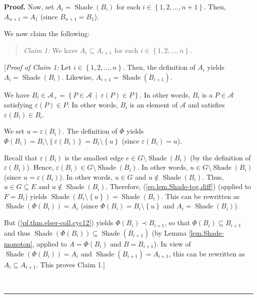 \documentclass[numbers=enddot,12pt,final,onecolumn]{scrartcl}%
\theoremstyle{definition}
\newenvironment{statement}{\begin{quote}}{\end{quote}}
\newenvironment{proof}[1][Proof]{\noindent\textbf{#1.} }{\ \rule{0.5em}{0.5em}}
\begin{document}
\begin{proof}
Now, set $A_{i}=\operatorname*{Shade}\left(  B_{i}\right)  $ for each
$i\in\left\{  1,2,\ldots,n+1\right\}  $. Then, $A_{n+1}=A_{1}$ (since
$B_{n+1}=B_{1}$).

We now claim the following:

\begin{statement}
\textit{Claim 1:} We have $A_{i}\subseteq A_{i+1}$ for each $i\in\left\{
1,2,\ldots,n\right\}  $.
\end{statement}

[\textit{Proof of Claim 1:} Let $i\in\left\{  1,2,\ldots,n\right\}  $. Then,
the definition of $A_{i}$ yields $A_{i}=\operatorname*{Shade}\left(
B_{i}\right)  $. Likewise, $A_{i+1}=\operatorname*{Shade}\left(
B_{i+1}\right)  $.

We have $B_{i}\in\mathcal{A}_{+}=\left\{  P\in\mathcal{A}\ \mid\ \varepsilon
\left(  P\right)  \in P\right\}  $. In other words, $B_{i}$ is a
$P\in\mathcal{A}$ satisfying $\varepsilon\left(  P\right)  \in P$. In other
words, $B_{i}$ is an element of $\mathcal{A}$ and satisfies $\varepsilon
\left(  B_{i}\right)  \in B_{i}$.

We set $u=\varepsilon\left(  B_{i}\right)  $. The definition of $\Phi$ yields
$\Phi\left(  B_{i}\right)  =B_{i}\setminus\left\{  \varepsilon\left(
B_{i}\right)  \right\}  =B_{i}\setminus\left\{  u\right\}  $ (since
$\varepsilon\left(  B_{i}\right)  =u$).

Recall that $\varepsilon\left(  B_{i}\right)  $ is the smallest edge $e\in
G\setminus\operatorname*{Shade}\left(  B_{i}\right)  $ (by the definition of
$\varepsilon\left(  B_{i}\right)  $). Hence, $\varepsilon\left(  B_{i}\right)
\in G\setminus\operatorname*{Shade}\left(  B_{i}\right)  $. In other words,
$u\in G\setminus\operatorname*{Shade}\left(  B_{i}\right)  $ (since
$u=\varepsilon\left(  B_{i}\right)  $). In other words, $u\in G$ and
$u\notin\operatorname*{Shade}\left(  B_{i}\right)  $. Thus, $u\in G\subseteq
E$ and $u\notin\operatorname*{Shade}\left(  B_{i}\right)  $. Therefore,
(\ref{eq.lem.Shade-tog.diff}) (applied to $F=B_{i}$) yields
$\operatorname*{Shade}\left(  B_{i}\setminus\left\{  u\right\}  \right)
=\operatorname*{Shade}\left(  B_{i}\right)  $. This can be rewritten as
$\operatorname*{Shade}\left(  \Phi\left(  B_{i}\right)  \right)  =A_{i}$
(since $\Phi\left(  B_{i}\right)  =B_{i}\setminus\left\{  u\right\}  $ and
$A_{i}=\operatorname*{Shade}\left(  B_{i}\right)  $).

But (\ref{pf.thm.elser-coll.cyc12}) yields $\Phi\left(  B_{i}\right)  \prec
B_{i+1}$, so that $\Phi\left(  B_{i}\right)  \subseteq B_{i+1}$ and thus
$\operatorname*{Shade}\left(  \Phi\left(  B_{i}\right)  \right)
\subseteq\operatorname*{Shade}\left(  B_{i+1}\right)  $ (by Lemma
\ref{lem.Shade-monoton}, applied to $A=\Phi\left(  B_{i}\right)  $ and
$B=B_{i+1}$). In view of $\operatorname*{Shade}\left(  \Phi\left(
B_{i}\right)  \right)  =A_{i}$ and $\operatorname*{Shade}\left(
B_{i+1}\right)  =A_{i+1}$, this can be rewritten as $A_{i}\subseteq A_{i+1}$.
This proves Claim 1.]


\end{proof}
\end{document}
